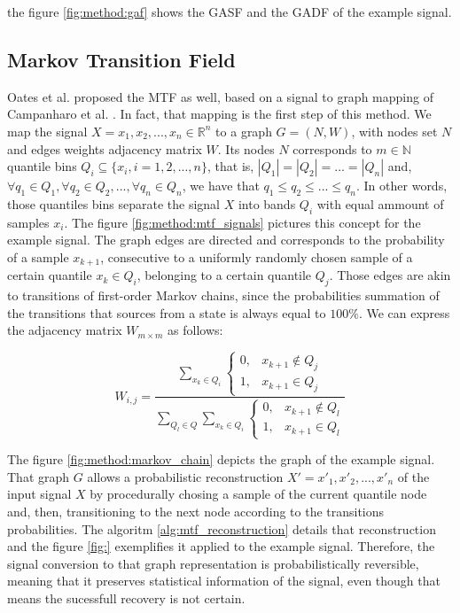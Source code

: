 \noindent the figure \ref{fig:method:gaf} shows the \gls{GASF} and the \gls{GADF} of the example signal.



\subsection{Markov Transition Field}



Oates et al. \cite{gaf-mtf-1} proposed the \gls{MTF} as well, based on a signal to graph mapping of Campanharo et al. \cite{mtf-2}. In fact, that mapping is the first step of this method. We map the signal $X=x_1,x_2,...,x_n \in \mathbb{R}^n$ to a graph $G=(N,W)$, with nodes set $N$ and edges weights adjacency matrix $W$. Its nodes $N$ corresponds to $m \in \mathbb{N}$ quantile bins $Q_i \subseteq \{x_i, i = 1,2,...,n\}$, that is, $|Q_1|=|Q_2|=...=|Q_n|$ and, $\forall q_1 \in Q_1, \forall q_2 \in Q_2, ..., \forall q_n \in Q_n$, we have that $q_1 \leq q_2 \leq ... \leq q_n$. In other words, those quantiles bins separate the signal $X$ into bands $Q_i$ with equal ammount of samples $x_i$. The figure \ref{fig:method:mtf_signals} pictures this concept for the example signal. The graph edges are directed and corresponds to the probability of a sample $x_{k+1}$, consecutive to a uniformly randomly chosen sample of a certain quantile $x_k \in Q_i$, belonging to a certain quantile $Q_j$. Those edges are akin to transitions of first-order Markov chains, since the probabilities summation of the transitions that sources from a state is always equal to $100\%$. We can express the adjacency matrix $W_{m \times m}$ as follows:  

\begin{equation}
	W_{i,j} = \frac{
			\sum\limits_{x_k \in Q_i} \begin{cases} 
				0, & x_{k+1} \not\in Q_j \\
				1, & x_{k+1} \in Q_j
			\end{cases}
		}{
			\sum\limits_{Q_l \in Q}\sum\limits_{x_k \in Q_i} \begin{cases} 
				0, & x_{k+1} \not\in Q_l \\
				1, & x_{k+1} \in Q_l
			\end{cases}
		}
\end{equation}



\noindent The figure \ref{fig:method:markov_chain} depicts the graph of the example signal. That graph $G$ allows a probabilistic reconstruction $X'=x'_1,x'_2,...,x'_n$ of the input signal $X$ by procedurally chosing a sample of the current quantile node and, then, transitioning to the next node according to the transitions probabilities. The algoritm \ref{alg:mtf_reconstruction} details that reconstruction and the figure \ref{fig:} exemplifies it applied to the example signal. Therefore, the signal conversion to that graph representation is probabilistically reversible, meaning that it preserves statistical information of the signal, even though that means the sucessfull recovery is not certain.

